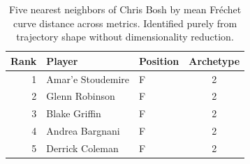 \begin{table}[htbp]
  \centering\small
  \begin{tabular}{rllc}
    \toprule
    Rank & Player & Position & Archetype \\
    \midrule
    1 & Amar'e Stoudemire & F & 2 \\
    2 & Glenn Robinson & F & 2 \\
    3 & Blake Griffin & F & 2 \\
    4 & Andrea Bargnani & F & 2 \\
    5 & Derrick Coleman & F & 2 \\
    \bottomrule
  \end{tabular}
  \caption{Five nearest neighbors of Chris Bosh by mean Fr\'{e}chet curve distance across metrics. Identified purely from trajectory shape without dimensionality reduction.}
  \label{tab:Chris_Bosh_frechet_curve_neighbors}
\end{table}

